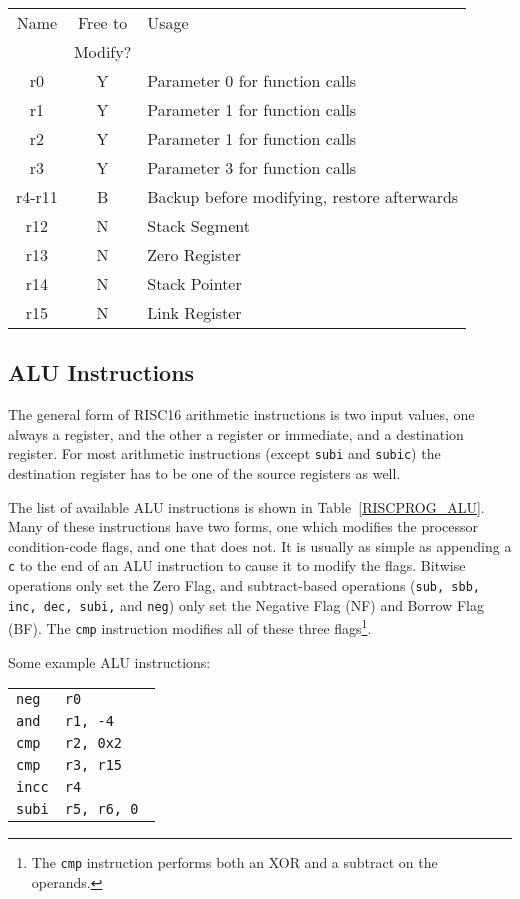 \begin{table}
\begin{center}
\begin{tabular}{c | c | l}
Name& Free to	& Usage \\
	& Modify?	&		\\
\hline
r0	& Y	& Parameter 0 for function calls \\
r1	& Y	& Parameter 1 for function calls \\
r2	& Y	& Parameter 1 for function calls \\
r3	& Y	& Parameter 3 for function calls \\
\hline
r4-r11	& B	& Backup before modifying, restore afterwards \\
\hline
r12	&	N	& Stack Segment \\
r13	&	N	& Zero Register \\
r14 &	N	& Stack Pointer \\
r15	&	N	& Link Register	\\
\end{tabular}
\end{center}
\end{table}


\subsection{ALU Instructions}

The general form of RISC16 arithmetic instructions is two input values, one
always a register, and the other a register or immediate, and a destination
register. For most arithmetic instructions (except \texttt{subi} and
\texttt{subic}) the destination register has to be one of the source registers as
well.

The list of available ALU instructions is shown in Table~\ref{RISCPROG_ALU}.
Many of these instructions have two forms, one which modifies the processor
condition-code flags, and one that does not. It is usually as simple as appending
a \texttt{c} to the end of an ALU instruction to cause it to modify the flags.
Bitwise operations only set the Zero Flag, and subtract-based operations
(\texttt{sub, sbb, inc, dec, subi,} and \texttt{neg}) only set the Negative Flag
(NF) and Borrow Flag (BF). The \texttt{cmp} instruction modifies all of these
three flags\footnote{The \texttt{cmp} instruction performs both an XOR and a
subtract on the operands.}.

Some example ALU instructions:
\begin{center}
\begin{minipage}{0.5\linewidth}
\begin{tabular}{l l}
\tt neg	& \tt r0	\\
\tt and	& \tt r1, -4	\\
\tt cmp	& \tt r2, 0x2	\\
\tt cmp	& \tt r3, r15	\\
\tt incc& \tt r4	\\
\tt subi& \tt r5, r6, 0	\\
\end{tabular}
\end{minipage}
\end{center}

